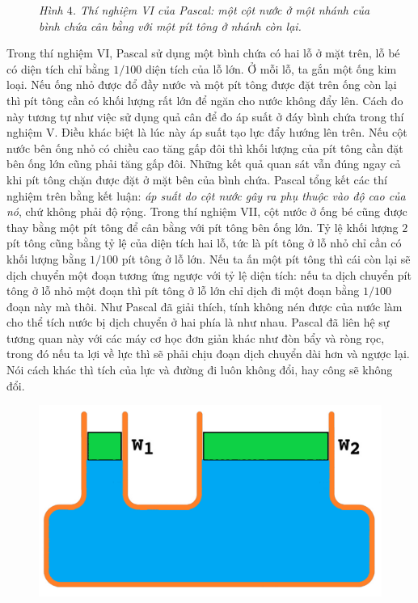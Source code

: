 \begin{multicols}{2}
\begin{figure}[H]
		\caption{\small\textit{\color{timhieukhoahoc}Hình $4$. Thí nghiệm VI của Pascal: một cột nước ở một nhánh của bình chứa cân bằng với một pít tông ở nhánh còn lại.}}
		\vspace*{-10pt}
	\end{figure}
	Trong thí nghiệm VI, Pascal sử dụng một bình chứa có hai lỗ ở mặt trên, lỗ bé có diện tích chỉ bằng $1/100$ diện tích của lỗ lớn. Ở mỗi lỗ, ta gắn một ống kim loại. Nếu ống nhỏ được đổ đầy nước và một pít tông được đặt trên ống còn lại thì pít tông cần có khối lượng rất lớn để ngăn cho nước không đẩy lên. Cách đo này tương tự như việc sử dụng quả cân để đo áp suất ở đáy bình chứa trong thí nghiệm V. Điều khác biệt là lúc này áp suất tạo lực đẩy hướng lên trên. Nếu cột nước bên ống nhỏ có chiều cao tăng gấp đôi thì khối lượng của pít tông cần đặt bên ống lớn cũng phải tăng gấp đôi. Những kết quả quan sát vẫn đúng ngay cả khi pít tông chặn được đặt ở mặt bên của bình chứa. Pascal tổng kết các thí nghiệm trên bằng kết luận: \textit{áp suất do cột nước gây ra phụ thuộc vào độ cao của nó}, chứ không phải độ rộng.
	\vskip 0.1cm
	\vskip 0.1cm
	Trong thí nghiệm VII, cột nước ở ống bé cũng được thay bằng một pít tông để cân bằng với pít tông bên ống lớn. Tỷ lệ khối lượng $2$ pít tông cũng bằng tỷ lệ của diện tích hai lỗ, tức là pít tông ở lỗ nhỏ chỉ cần có khối lượng bằng $1/100$ pít tông ở lỗ lớn. Nếu ta ấn một pít tông thì cái còn lại sẽ dịch chuyển một đoạn tương ứng ngược với tỷ lệ diện tích: nếu ta dịch chuyển pít tông ở lỗ nhỏ một đoạn thì pít tông ở lỗ lớn chỉ dịch đi một đoạn bằng $1/100$ đoạn này mà thôi. Như Pascal đã giải thích, tính không nén được của nước làm cho thể tích nước bị dịch chuyển ở hai phía là như nhau. Pascal đã liên hệ sự tương quan này với các máy cơ học đơn giản khác như đòn bẩy và ròng rọc, trong đó nếu ta lợi về lực thì sẽ phải chịu đoạn dịch chuyển dài hơn và ngược lại. Nói cách khác thì tích của lực và đường đi luôn không đổi, hay công sẽ không đổi.
	\begin{figure}[H]
		\vspace*{-5pt}
		\centering
		\captionsetup{labelformat= empty, justification=centering}
		\includegraphics[width= 0.8\linewidth]{6}

\end{figure}
\end{multicols}
